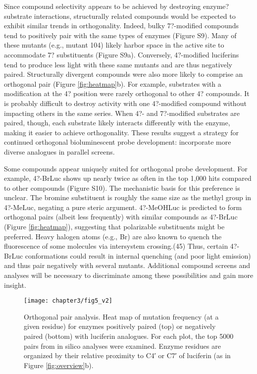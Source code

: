 \par
Since compound selectivity appears to be achieved by destroying enzyme?substrate interactions, structurally related compounds would be expected to exhibit similar trends in orthogonality. Indeed, bulky 7?-modified compounds tend to positively pair with the same types of enzymes (Figure S9). Many of these mutants (e.g., mutant 104) likely harbor space in the active site to accommodate 7? substituents (Figure S9a). Conversely, 4?-modified luciferins tend to produce less light with these same mutants and are thus negatively paired. Structurally divergent compounds were also more likely to comprise an orthogonal pair (Figure \ref{fig:heatmap}b). For example, substrates with a modification at the 4? position were rarely orthogonal to other 4? compounds. It is probably difficult to destroy activity with one 4?-modified compound without impacting others in the same series. When 4?- and 7?-modified substrates are paired, though, each substrate likely interacts differently with the enzyme, making it easier to achieve orthogonality. These results suggest a strategy for continued orthogonal bioluminescent probe development: incorporate more diverse analogues in parallel screens.
\par
Some compounds appear uniquely suited for orthogonal probe development. For example, 4?-BrLuc shows up nearly twice as often in the top 1,000 hits compared to other compounds (Figure S10). The mechanistic basis for this preference is unclear. The bromine substituent is roughly the same size as the methyl group in 4?-MeLuc, negating a pure steric argument. 4?-MeOHLuc is predicted to form orthogonal pairs (albeit less frequently) with similar compounds as 4?-BrLuc (Figure \ref{fig:heatmap}), suggesting that polarizable substituents might be preferred. Heavy halogen atoms (e.g., Br) are also known to quench the fluorescence of some molecules via intersystem crossing.\cite{Solovyov:2005by}(45) Thus, certain 4?-BrLuc conformations could result in internal quenching (and poor light emission) and thus pair negatively with several mutants. Additional compound screens and analyses will be necessary to discriminate among these possibilities and gain more insight.
\par
\begin{figure}[htbp]
\texttt{[image: chapter3/fig5\_v2]}
\centering
\caption[Orthogonal pair analysis]{Orthogonal pair analysis. Heat map of mutation frequency (at a given residue) for enzymes positively paired (top) or negatively paired (bottom) with luciferin analogues. For each plot, the top 5000 pairs from in silico analyses were examined. Enzyme residues are organized by their relative proximity to C4′ or C7′ of luciferin (as in Figure \ref{fig:overview}b).}
  \label{fig:willsHeatmap}
\end{figure}
